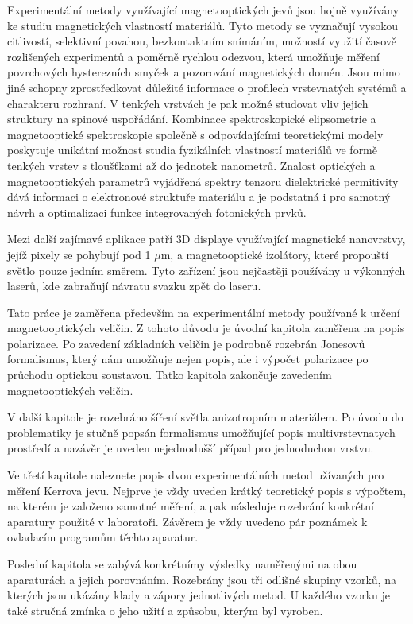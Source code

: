 Experimentální metody využívající magnetooptických jevů jsou hojně využívány ke studiu 
magnetických vlastností materiálů.  Tyto metody se vyznačují vysokou citlivostí, 
selektivní povahou, bezkontaktním snímáním, možností využití časově rozlišených experimentů 
a poměrně rychlou odezvou, která umožňuje měření povrchových hysterezních smyček a pozorování 
magnetických domén. Jsou mimo jiné schopny zprostředkovat důležité informace o profilech 
vrstevnatých systémů a charakteru rozhraní. V tenkých vrstvách je pak možné studovat vliv 
jejich struktury na spinové uspořádání. Kombinace spektroskopické elipsometrie a 
magnetooptické spektroskopie společně s odpovídajícími teoretickými modely poskytuje unikátní 
možnost studia fyzikálních vlastností materiálů ve formě tenkých vrstev s tloušťkami až do 
jednotek nanometrů. Znalost optických a magnetooptických parametrů vyjádřená spektry tenzoru 
dielektrické permitivity dává informaci o elektronové struktuře materiálu a je podstatná 
i pro samotný návrh a optimalizaci funkce integrovaných fotonických prvků.

Mezi další zajímavé aplikace patří 3D displaye využívající magnetické nanovrstvy, jejíž pixely se pohybují pod 1 $\mu$m, 
a magnetooptické izolátory, které propouští světlo pouze jedním směrem. Tyto zařízení jsou nejčastěji používány u výkonných 
laserů, kde zabraňují návratu svazku zpět do laseru.

Tato práce je zaměřena především na experimentální metody používané k určení magnetooptických veličin. Z tohoto důvodu 
je úvodní kapitola zaměřena na popis polarizace. Po zavedení základních veličin je podrobně rozebrán Jonesovů formalismus, 
který nám umožňuje nejen popis, ale i výpočet polarizace po průchodu optickou soustavou. Tatko kapitola zakončuje zavedením magnetooptických veličin.

V další kapitole je rozebráno šíření světla anizotropním materiálem. Po úvodu do problematiky je stučně popsán formalismus umožňující popis multivrstevnatych 
prostředí a nazávěr je uveden nejednodušší případ pro jednoduchou vrstvu.

Ve třetí kapitole naleznete popis dvou experimentálních metod užívaných pro měření Kerrova jevu. Nejprve je vždy uveden krátký teoretický popis s 
výpočtem, na kterém je založeno samotné měření, a pak následuje rozebrání konkrétní aparatury použité v laboratoři. Závěrem je vždy uvedeno pár 
poznámek k ovladacím programům těchto aparatur.

Poslední kapitola se zabývá konkrétnímy výsledky naměřenými na obou aparaturách a jejich porovnáním. Rozebrány jsou tři odlišné skupiny vzorků, 
na kterých jsou ukázány klady a zápory jednotlivých metod. U každého vzorku je také stručná zmínka o jeho užití a způsobu, kterým byl vyroben.

